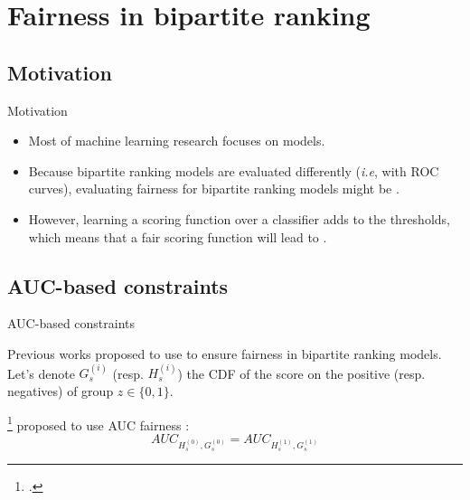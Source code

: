 \section{Fairness in bipartite ranking}

\subsection{Motivation}
\begin{frame}{Motivation}
    \begin{itemize}
        \item Most of  machine learning research focuses on  models.
        \item Because bipartite ranking models are evaluated differently (\textit{i.e}, with ROC curves), evaluating fairness for bipartite ranking models might be .        
        \item However, learning a scoring function over a classifier adds  to the thresholds, which means that a fair scoring function will lead to .
    \end{itemize}
\end{frame}


\subsection{AUC-based constraints}
\begin{frame}{AUC-based constraints}
    
    Previous works proposed to use  to ensure fairness in bipartite ranking models. Let's denote $G_s^{(i)}$ (resp. $H_s^{(i)}$) the CDF of the score on the positive (resp. negatives) of group $z \in \{0,1\}$.
    
    \citeauthor{beutel2019fairness}\footcite{beutel2019fairness} proposed to use  AUC fairness :
    \begin{equation}
        AUC_{H_s^{(0)},G_s^{(0)}} = AUC_{H_s^{(1)},G_s^{(1)}}
    \end{equation}

\end{frame}


